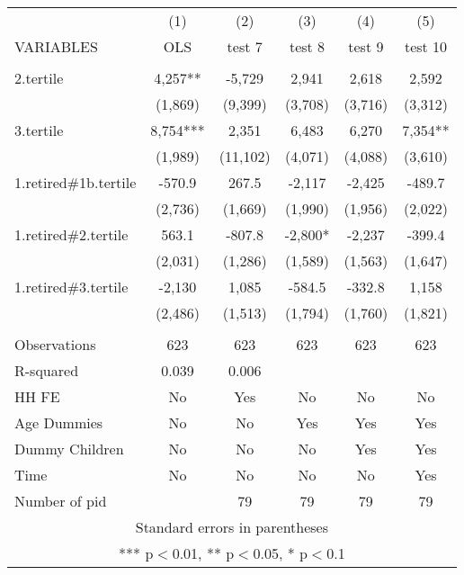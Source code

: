 \begin{tabular}{lccccc} \hline
 & (1) & (2) & (3) & (4) & (5) \\
VARIABLES & OLS & test 7 & test 8 & test 9 & test 10 \\ \hline
 &  &  &  &  &  \\
2.tertile & 4,257** & -5,729 & 2,941 & 2,618 & 2,592 \\
 & (1,869) & (9,399) & (3,708) & (3,716) & (3,312) \\
3.tertile & 8,754*** & 2,351 & 6,483 & 6,270 & 7,354** \\
 & (1,989) & (11,102) & (4,071) & (4,088) & (3,610) \\
1.retired\#1b.tertile & -570.9 & 267.5 & -2,117 & -2,425 & -489.7 \\
 & (2,736) & (1,669) & (1,990) & (1,956) & (2,022) \\
1.retired\#2.tertile & 563.1 & -807.8 & -2,800* & -2,237 & -399.4 \\
 & (2,031) & (1,286) & (1,589) & (1,563) & (1,647) \\
1.retired\#3.tertile & -2,130 & 1,085 & -584.5 & -332.8 & 1,158 \\
 & (2,486) & (1,513) & (1,794) & (1,760) & (1,821) \\
 &  &  &  &  &  \\
Observations & 623 & 623 & 623 & 623 & 623 \\
R-squared & 0.039 & 0.006 &  &  &  \\
HH FE & No & Yes & No & No & No \\
Age Dummies & No & No & Yes & Yes & Yes \\
Dummy Children & No & No & No & Yes & Yes \\
Time & No & No & No & No & Yes \\
 Number of pid &  & 79 & 79 & 79 & 79 \\ \hline
\multicolumn{6}{c}{ Standard errors in parentheses} \\
\multicolumn{6}{c}{ *** p$<$0.01, ** p$<$0.05, * p$<$0.1} \\
\end{tabular}
